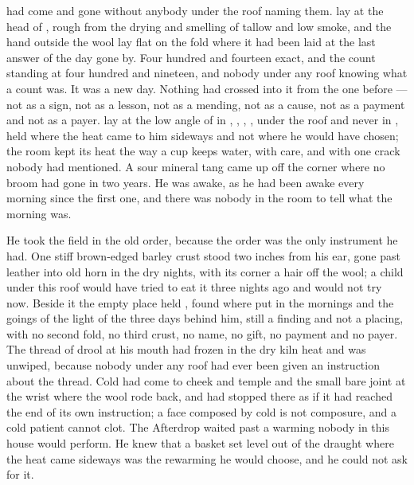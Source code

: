 
 had come and gone without anybody under the roof naming them.  lay at the head of , rough from the drying and smelling of tallow and low smoke, and the hand outside the wool lay flat on the fold where it had been laid at the last answer of the day gone by. Four hundred and fourteen exact, and the count standing at four hundred and nineteen, and nobody under any roof knowing what a count was. It was a new day. Nothing had crossed into it from the one before --- not as a sign, not as a lesson, not as a mending, not as a cause, not as a payment and not as a payer.  lay at the low angle of  in , , , , under the roof and never in , held where the heat came to him sideways and not where he would have chosen; the room kept its heat the way a cup keeps water, with care, and with one crack nobody had mentioned. A sour mineral tang came up off the corner where no broom had gone in two years. He was awake, as he had been awake every morning since the first one, and there was nobody in the room to tell what the morning was.

He took the field in the old order, because the order was the only instrument he had. One stiff brown-edged barley crust stood two inches from his ear, gone past leather into old horn in the dry nights, with its corner a hair off the wool; a child under this roof would have tried to eat it three nights ago and would not try now. Beside it the empty place held , found where put in the mornings and the goings of the light of the three days behind him, still a finding and not a placing, with no second fold, no third crust, no name, no gift, no payment and no payer. The thread of drool at his mouth had frozen in the dry kiln heat and was unwiped, because nobody under any roof had ever been given an instruction about the thread. Cold had come to cheek and temple and the small bare joint at the wrist where the wool rode back, and had stopped there as if it had reached the end of its own instruction; a face composed by cold is not composure, and a cold patient cannot clot. The Afterdrop waited past a warming nobody in this house would perform. He knew that a basket set level out of the draught where the heat came sideways was the rewarming he would choose, and he could not ask for it.

